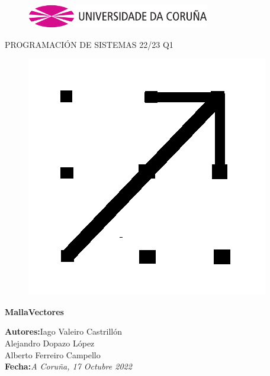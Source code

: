 \documentclass[a4paper,openright,12pt]{article}
\begin{document}
\begin{titlepage}
    \begin{center}
        \vspace*{-1in}
        \begin{figure}[htb]
            \begin{center}
                \includegraphics[width=8cm]{udc.eps}
            \end{center}
        \end{figure}

        \vspace*{1in}
        PROGRAMACIÓN DE SISTEMAS 22/23 Q1\\
        \begin{figure}[htb]
            \begin{center}
                \includegraphics{icon.png}
            \end{center}
        \end{figure}
        \vspace*{1in}
        \begin{Large}
            \textbf{MallaVectores} \\
        \end{Large}
        
        \vspace*{3in}
        
        \begin{large}
            \raggedleft
            \textbf{Autores:}Iago Valeiro Castrillón \\
            Alejandro Dopazo López \\
            Alberto Ferreiro Campello \\
            \textbf{Fecha:}\textit{A Coruña, 17 Octubre 2022}\\
        \end{large}
        
    \end{center}
\end{titlepage} 
\end{document}
